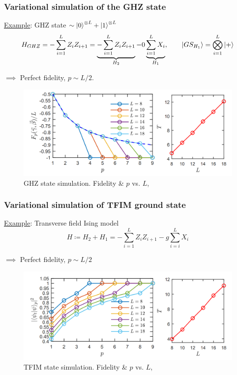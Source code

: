 \documentclass{beamer}
\theoremstyle{definition}
\begin{document}
\begin{frame}
\frametitle{Variational simulation of the GHZ state}

\underline{Example}: GHZ state $\sim \left\vert{0}\right\rangle^{\otimes L} + \left\vert{1}\right\rangle^{\otimes L} $ 
\begin{equation*}
H_{GHZ} = -\sum^L_{i=1}Z_i Z_{i+1} = \underbrace{-\sum^L_{i=1}Z_i Z_{i+1}}_{H_2} - 0\underbrace{\sum^L_{i=1}X_i}_{H_1}, \qquad \left\vert{GS_{H_1}}\right\rangle = \bigotimes^L_{i=1} \left\vert{+}\right\rangle
\end{equation*}


$\implies$ Perfect fidelity, $p \sim L/2$.

\begin{figure}[!htb]
	\centering
	\includegraphics[scale=0.25]{ghz1}
	\caption{GHZ state simulation. Fidelity \& $p$ vs. $L$, \cite{VQCS}}
\end{figure}

\end{frame}




\begin{frame}
\frametitle{Variational simulation of TFIM ground state}

\underline{Example}: Transverse field Ising model
\begin{equation*}
H \coloneqq H_2 + H_1 =  - \sum_{i=1}^L Z_i Z_{i+1} - g\sum^L_{i=i}X_i
\end{equation*}


$\implies$ Perfect fidelity, $p\sim L/2$
\begin{figure}[!htb]
	\centering
	\includegraphics[scale=0.25]{tfim}
	\caption{TFIM state simulation. Fidelity \& $p$ vs. $L$, \cite{VQCS}}
\end{figure}






\end{frame}
\end{document}
